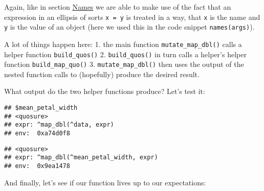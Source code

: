 \documentclass[]{book}
\newenvironment{Shaded}{\begin{snugshade}}{\end{snugshade}}
\newcommand{\DataTypeTok}[1]{\textcolor[rgb]{0.13,0.29,0.53}{#1}}
\newcommand{\KeywordTok}[1]{\textcolor[rgb]{0.13,0.29,0.53}{\textbf{#1}}}
\newcommand{\NormalTok}[1]{#1}
\newcommand{\OperatorTok}[1]{\textcolor[rgb]{0.81,0.36,0.00}{\textbf{#1}}}
\newcommand{\StringTok}[1]{\textcolor[rgb]{0.31,0.60,0.02}{#1}}
\begin{document}
Again, like in section \protect\hyperlink{named}{Names} we are able to make use of the fact that an expression in an ellipsis of sorts \texttt{x\ =\ y} is treated in a way, that \texttt{x} is the name and \texttt{y} is the value of an object (here we used this in the code snippet \texttt{names(args)}).

A lot of things happen here:
1. the main function \texttt{mutate\_map\_dbl()} calls a helper function \texttt{build\_quos()}
2. \texttt{build\_quos()} in turn calls a helper's helper function \texttt{build\_map\_quo()}
3. \texttt{mutate\_map\_dbl()} then uses the output of the nested function calls to (hopefully) produce the desired result.

What output do the two helper functions produce? Let's test it:

\begin{Shaded}
\end{Shaded}

\begin{verbatim}
## $mean_petal_width
## <quosure>
## expr: ^map_dbl(^data, expr)
## env:  0xa74d0f8
\end{verbatim}

\begin{Shaded}
\end{Shaded}

\begin{verbatim}
## <quosure>
## expr: ^map_dbl(^mean_petal_width, expr)
## env:  0x9ea1478
\end{verbatim}

And finally, let's see if our function lives up to our expectations:

\begin{Shaded}
\end{Shaded}
\end{document}
